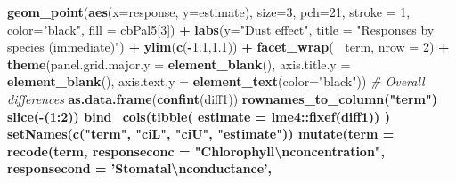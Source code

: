 \documentclass[]{scrartcl}
\newenvironment{Shaded}{\begin{snugshade}}{\end{snugshade}}
\newcommand{\CharTok}[1]{\textcolor[rgb]{0.31,0.60,0.02}{#1}}
\newcommand{\CommentTok}[1]{\textcolor[rgb]{0.56,0.35,0.01}{\textit{#1}}}
\newcommand{\DataTypeTok}[1]{\textcolor[rgb]{0.13,0.29,0.53}{#1}}
\newcommand{\DecValTok}[1]{\textcolor[rgb]{0.00,0.00,0.81}{#1}}
\newcommand{\FloatTok}[1]{\textcolor[rgb]{0.00,0.00,0.81}{#1}}
\newcommand{\KeywordTok}[1]{\textcolor[rgb]{0.13,0.29,0.53}{\textbf{#1}}}
\newcommand{\NormalTok}[1]{#1}
\newcommand{\OperatorTok}[1]{\textcolor[rgb]{0.81,0.36,0.00}{\textbf{#1}}}
\newcommand{\StringTok}[1]{\textcolor[rgb]{0.31,0.60,0.02}{#1}}
\begin{document}
\begin{Shaded}
\begin{Highlighting}[]
{{{{{{{{{{{{{{{{\StringTok{     }\KeywordTok{geom_point}\NormalTok{(}\KeywordTok{aes}\NormalTok{(}\DataTypeTok{x=}\NormalTok{response, }\DataTypeTok{y=}\NormalTok{estimate), }
                \DataTypeTok{size=}\DecValTok{3}\NormalTok{, }
                \DataTypeTok{pch=}\DecValTok{21}\NormalTok{, }
                \DataTypeTok{stroke =} \DecValTok{1}\NormalTok{, }
                \DataTypeTok{color=}\StringTok{"black"}\NormalTok{, }
                \DataTypeTok{fill =}\NormalTok{ cbPal5[}\DecValTok{3}\NormalTok{]) }\OperatorTok{+}\StringTok{ }
\StringTok{     }\KeywordTok{labs}\NormalTok{(}\DataTypeTok{y=}\StringTok{"Dust effect"}\NormalTok{, }
          \DataTypeTok{title =} \StringTok{"Responses by species (immediate)"}\NormalTok{) }\OperatorTok{+}
\StringTok{    }\KeywordTok{ylim}\NormalTok{(}\KeywordTok{c}\NormalTok{(}\OperatorTok{-}\FloatTok{1.1}\NormalTok{,}\FloatTok{1.1}\NormalTok{)) }\OperatorTok{+}\StringTok{ }
\StringTok{      }\KeywordTok{facet_wrap}\NormalTok{(}\OperatorTok{~}\StringTok{ }\NormalTok{term, }\DataTypeTok{nrow =} \DecValTok{2}\NormalTok{) }\OperatorTok{+}\StringTok{ }
\StringTok{     }\KeywordTok{theme}\NormalTok{(}\DataTypeTok{panel.grid.major.y =} \KeywordTok{element_blank}\NormalTok{(),}
           \DataTypeTok{axis.title.y =} \KeywordTok{element_blank}\NormalTok{(), }
           \DataTypeTok{axis.text.y =} \KeywordTok{element_text}\NormalTok{(}\DataTypeTok{color=}\StringTok{"black"}\NormalTok{)) }
\CommentTok{# Overall differences}
  \KeywordTok{as.data.frame}\NormalTok{(}\KeywordTok{confint}\NormalTok{(diff1)) }\OperatorTok{%
\StringTok{                }\KeywordTok{rownames_to_column}\NormalTok{(}\StringTok{"term"}\NormalTok{) }\OperatorTok{%
\StringTok{                }\KeywordTok{slice}\NormalTok{(}\OperatorTok{-}\NormalTok{(}\DecValTok{1}\OperatorTok{:}\DecValTok{2}\NormalTok{)) }\OperatorTok{%
\StringTok{                }\KeywordTok{bind_cols}\NormalTok{(}\KeywordTok{tibble}\NormalTok{(}
                  \DataTypeTok{estimate =}\NormalTok{ lme4}\OperatorTok{::}\KeywordTok{fixef}\NormalTok{(diff1)) ) }\OperatorTok{%
\StringTok{    }\KeywordTok{setNames}\NormalTok{(}\KeywordTok{c}\NormalTok{(}\StringTok{"term"}\NormalTok{, }\StringTok{"ciL"}\NormalTok{, }\StringTok{"ciU"}\NormalTok{, }\StringTok{"estimate"}\NormalTok{))}\OperatorTok{%
\StringTok{  }\KeywordTok{mutate}\NormalTok{(}\DataTypeTok{term =} \KeywordTok{recode}\NormalTok{(term, }
              \DataTypeTok{responseconc =} \StringTok{"Chlorophyll}\CharTok{\textbackslash{}n}\StringTok{concentration"}\NormalTok{, }
              \DataTypeTok{responsecond =} \StringTok{'Stomatal}\CharTok{\textbackslash{}n}\StringTok{conductance'}\NormalTok{, }
}}}}}}}}}}}}}}}}}}}}}
\end{Highlighting}
\end{Shaded}
\end{document}
